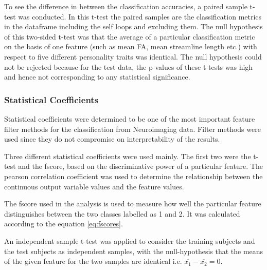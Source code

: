\documentclass[msthesis.tex]{subfiles}
\begin{document}
To see the difference in between the classification accuracies, a paired sample t-test was conducted. In this t-test the paired samples are the classification metrics in the dataframe including the self loops and excluding them. The null hypothesis of this two-sided t-test was that the average of a particular classification metric on the basis of one feature (such as mean FA, mean streamline length etc.) with respect to five different personality traits was identical. The null hypothesis could not be rejected because for the test data, the p-values of these t-tests was high and hence not corresponding to any statistical significance. 

\subsubsection{Statistical Coefficients}
\label{subsub:statcoef}

Statistical coefficients were determined to be one of the most important feature filter methods for the classification from Neuroimaging data. Filter methods were used since they do not compromise on interpretability of the results.

Three different statistical coefficients were used mainly. The first two were the t-test and the fscore, based on the discriminative power of a particular feature. The pearson correlation coefficient was used to determine the relationship between the continuous output variable values and the feature values. 

The fscore used in the analysis is used to measure how well the particular feature distinguishes between the two classes labelled as 1 and 2. It  was calculated according to the equation \ref{eq:fscores}. 

An independent sample t-test was applied to consider the training subjects and the test subjects as independent samples, with the null-hypothesis that the means of the given feature for the two samples are identical i.e. $\overline{x_{1}} - \overline{x_{2}} = 0$.
\end{document}
